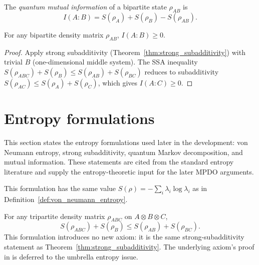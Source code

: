 \begin{definition}\label{def:mutual_information}
    \leanok
    The \emph{quantum mutual information} of a bipartite state
    $\rho_{AB}$ is
    \[
        I(A{:}B) = S(\rho_A) + S(\rho_B) - S(\rho_{AB}).
    \]
\end{definition}

\begin{theorem}\label{thm:mutual_information_nonneg}
    \leanok
    For any bipartite density matrix $\rho_{AB}$,
    $I(A{:}B) \ge 0$.
\end{theorem}

\begin{proof}\leanok
    Apply strong subadditivity (Theorem~\ref{thm:strong_subadditivity})
    with trivial $B$ (one-dimensional middle system).
    The SSA inequality $S(\rho_{ABC}) + S(\rho_B) \le S(\rho_{AB}) + S(\rho_{BC})$
    reduces to subadditivity $S(\rho_{AC}) \le S(\rho_A) + S(\rho_C)$,
    which gives $I(A{:}C) \ge 0$.
\end{proof}

\section{Entropy formulations}

This section states the entropy formulations used later in the
development: von Neumann entropy, strong subadditivity, quantum Markov
decomposition, and mutual information. These statements are cited from the
standard entropy literature and supply the entropy-theoretic input for the
later MPDO arguments.

\begin{definition}\label{def:entropy_von_neumann_entropy}
    \leanok
    This formulation has the same value
    $S(\rho) = -\sum_i \lambda_i \log \lambda_i$ as in
    Definition~\ref{def:von_neumann_entropy}.
\end{definition}

\begin{theorem}\label{thm:entropy_strong_subadditivity}
    \leanok
    For any tripartite density matrix $\rho_{ABC}$ on
    $A \otimes B \otimes C$,
    \[
        S(\rho_{ABC}) + S(\rho_B) \le S(\rho_{AB}) + S(\rho_{BC}).
    \]
    This formulation introduces no new axiom: it is the same
    strong-subadditivity statement as
    Theorem~\ref{thm:strong_subadditivity}. The underlying axiom's
    proof in \cite{LiebRuskai1973Proof} is deferred to the umbrella entropy
    issue.
\end{theorem}

